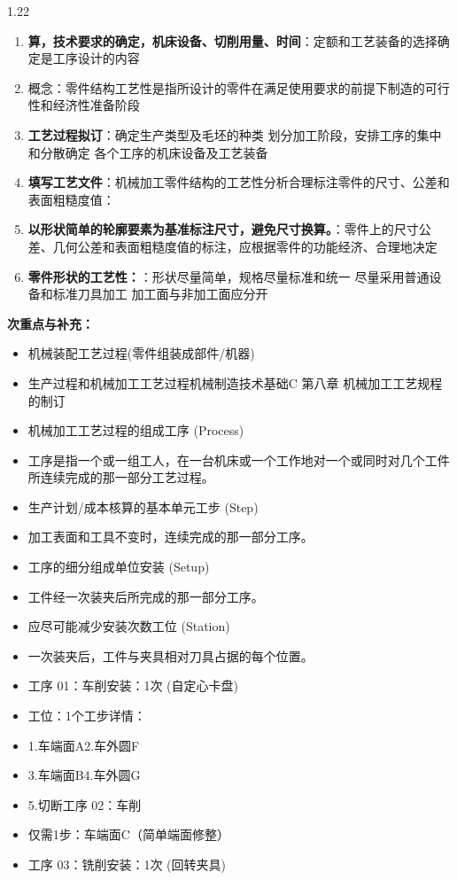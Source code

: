 \documentclass[12pt,a4paper]{article}
\begin{document}
\begin{spacing}{1.22}
\begin{tcolorbox}[colback=yellow!6,colframe=red!55!black,title=重点,left=1mm,right=1mm]
\begin{enumerate}[leftmargin=2.2em,label=\arabic*.]
  \item \textbf{算，技术要求的确定，机床设备、切削用量、时间}：定额和工艺装备的选择确定是工序设计的内容
  \item 概念：零件结构工艺性是指所设计的零件在满足使用要求的前提下制造的可行性和经济性准备阶段
  \item \textbf{工艺过程拟订}：确定生产类型及毛坯的种类 划分加工阶段，安排工序的集中和分散确定 各个工序的机床设备及工艺装备
  \item \textbf{填写工艺文件}：机械加工零件结构的工艺性分析合理标注零件的尺寸、公差和表面粗糙度值：
  \item \textbf{以形状简单的轮廓要素为基准标注尺寸，避免尺寸换算。}：零件上的尺寸公差、几何公差和表面粗糙度值的标注，应根据零件的功能经济、合理地决定
  \item \textbf{零件形状的工艺性：}：形状尽量简单，规格尽量标准和统一 尽量采用普通设备和标准刀具加工 加工面与非加工面应分开
\end{enumerate}
\end{tcolorbox}
\noindent\textbf{次重点与补充：}
\begin{itemize}[leftmargin=2.2em,label=--]
  \item 机械装配工艺过程(零件组装成部件/机器)
  \item 生产过程和机械加工工艺过程机械制造技术基础C 第八章 机械加工工艺规程的制订
  \item 机械加工工艺过程的组成工序 (Process)
  \item 工序是指一个或一组工人，在一台机床或一个工作地对一个或同时对几个工件所连续完成的那一部分工艺过程。
  \item 生产计划/成本核算的基本单元工步 (Step)
  \item 加工表面和工具不变时，连续完成的那一部分工序。
  \item 工序的细分组成单位安装 (Setup)
  \item 工件经一次装夹后所完成的那一部分工序。
  \item 应尽可能减少安装次数工位 (Station)
  \item 一次装夹后，工件与夹具相对刀具占据的每个位置。
  \item 工序 01：车削安装：1次 (自定心卡盘)
  \item 工位：1个工步详情：
  \item 1.车端面A2.车外圆F
  \item 3.车端面B4.车外圆G
  \item 5.切断工序 02：车削
  \item 仅需1步：车端面C（简单端面修整）
  \item 工序 03：铣削安装：1次 (回转夹具)

\end{itemize}
\end{spacing}
\end{document}
